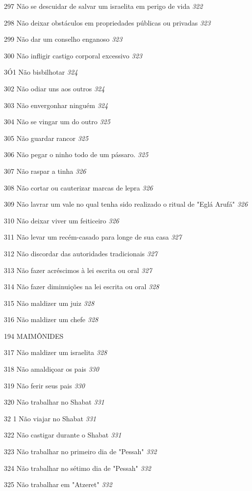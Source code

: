 297 Não se descuidar de salvar um israelita em perigo de vida \emph{322}

298 Não deixar obstáculos em propriedades públicas ou privadas
\emph{323}

299 Não dar um conselho enganoso \emph{323}

300 Não infligir castigo corporal excessivo \emph{323}

3Ó1 Não bisbilhotar \emph{324}

302 Não odiar uns aos outros \emph{324}

303 Não envergonhar ninguém \emph{324}

304 Não se vingar um do outro \emph{325}

305 Não guardar rancor \emph{325}

306 Não pegar o ninho todo de um pássaro. \emph{325}

307 Não raspar a tinha \emph{326}

308 Não cortar ou cauterizar marcas de lepra \emph{326}

309 Não lavrar um vale no qual tenha sido realizado o ritual de "Eglá
Arufá" \emph{326}

310 Não deixar viver um feiticeiro \emph{326}

311 Não levar um recém-casado para longe de sua casa \emph{327}

312 Não discordar das autoridades tradicionais \emph{327}

313 Não fazer acréscimos à lei escrita ou oral \emph{327}

314 Não fazer diminuições na lei escrita ou oral \emph{328}

315 Não maldizer um juiz \emph{328}

316 Não maldizer um chefe \emph{328}

194 MAIMÔNIDES

317 Não maldizer um israelita \emph{328}

318 Não amaldiçoar os pais \emph{330}

319 Não ferir seus pais \emph{330}

320 Não trabalhar no Shabat \emph{331}

32 1 Não viajar no Shabat \emph{331}

322 Não castigar durante o Shabat \emph{331}

323 Não trabalhar no primeiro dia de "Pessah" \emph{332}

324 Não trabalhar no sétimo dia de "Pessah" \emph{332}

325 Não trabalhar em "Atzeret" \emph{332}

